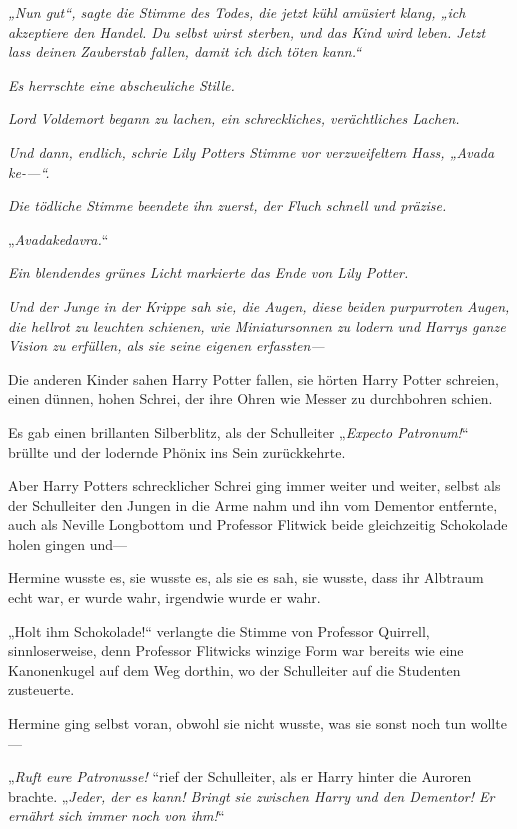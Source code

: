 \emph{„Nun gut“, sagte die Stimme des Todes, die jetzt kühl amüsiert klang, „ich akzeptiere den Handel. Du selbst wirst sterben, und das Kind wird leben. Jetzt lass deinen Zauberstab fallen, damit ich dich töten kann.“}

\emph{Es herrschte eine abscheuliche Stille.}

\emph{Lord Voldemort begann zu lachen, ein schreckliches, verächtliches Lachen.}

\emph{Und dann, endlich, schrie Lily Potters Stimme vor verzweifeltem Hass, „Avada ke-\/—“.}

\emph{Die tödliche Stimme beendete ihn zuerst, der Fluch schnell und präzise.}

„\emph{Avadakedavra.}“

\emph{Ein blendendes grünes Licht markierte das Ende von Lily Potter.}

\emph{Und der Junge in der Krippe sah sie, die Augen, diese beiden purpurroten Augen, die hellrot zu leuchten schienen, wie Miniatursonnen zu lodern und Harrys ganze Vision zu erfüllen, als sie seine eigenen erfassten—}

Die anderen Kinder sahen Harry Potter fallen, sie hörten Harry Potter schreien, einen dünnen, hohen Schrei, der ihre Ohren wie Messer zu durchbohren schien.

Es gab einen brillanten Silberblitz, als der Schulleiter „\emph{Expecto Patronum!}“ brüllte und der lodernde Phönix ins Sein zurückkehrte.

Aber Harry Potters schrecklicher Schrei ging immer weiter und weiter, selbst als der Schulleiter den Jungen in die Arme nahm und ihn vom Dementor entfernte, auch als Neville Longbottom und Professor Flitwick beide gleichzeitig Schokolade holen gingen und—

Hermine wusste es, sie wusste es, als sie es sah, sie wusste, dass ihr Albtraum echt war, er wurde wahr, irgendwie wurde er wahr.

„Holt ihm Schokolade!“ verlangte die Stimme von Professor Quirrell, sinnloserweise, denn Professor Flitwicks winzige Form war bereits wie eine Kanonenkugel auf dem Weg dorthin, wo der Schulleiter auf die Studenten zusteuerte.

Hermine ging selbst voran, obwohl sie nicht wusste, was sie sonst noch tun wollte—

„\emph{Ruft eure Patronusse!} “rief der Schulleiter, als er Harry hinter die Auroren brachte. „\emph{Jeder, der es kann! Bringt sie zwischen Harry und den Dementor! Er} \emph{ernährt sich immer noch von ihm!}“

